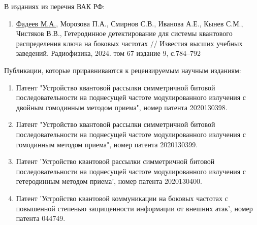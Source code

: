 В изданиях из перечня ВАК РФ: 
\begin{enumerate}
    \item \underline{Фадеев М.А.}, Морозова П.А., Смирнов С.В., Иванова А.Е., Кынев С.М., Чистяков В.В., Гетеродинное детектирование для системы квантового распределения ключа на боковых частотах // Известия высших учебных заведений. Радиофизика, 2024. том 67 издание 9, с.784--792
\end{enumerate}

Публикации, которые приравниваются к рецензируемым научным изданиям:
\begin{enumerate}
    \item Патент "Устройство квантовой рассылки симметричной битовой последовательности на поднесущей частоте модулированного излучения с двойным гомодинным методом приема", номер патента 2020130398.
    \item Патент "Устройство квантовой рассылки симметричной битовой последовательности на поднесущей частоте модулированного излучения с гомодинным методом приема", номер патента 2020130399.
    \item Патент 'Устройство квантовой рассылки симметричной битовой последовательности на поднесущей частоте модулированного излучения с гетеродинным методом приема', номер патента 2020130400.
    \item Патент 'Устройство квантовой коммуникации на боковых частотах с повышенной степенью защищенности информации от внешних атак', номер патента 044749.

\end{enumerate}